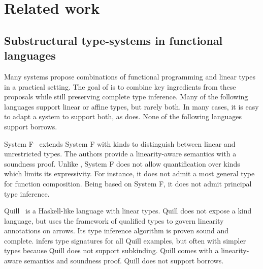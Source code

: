 \section{Related work}
\label{sec:related-work}





\subsection{Substructural type-systems in functional languages}

Many systems propose combinations of
functional programming and linear types in a practical setting.
The goal of \lang is to combine key ingredients
from these proposals while still preserving
complete type inference.
Many of the following languages support linear or affine types, but rarely
both. In many cases, it is easy to adapt a system to support both, as
\lang does.
None of the following languages support borrows.

System F\degree~\citep{DBLP:conf/tldi/MazurakZZ10}
extends System F with kinds to distinguish
between linear and unrestricted types.
The authors provide
a linearity-aware semantics with a soundness proof.
Unlike \lang, System F\degree{} does not allow
quantification over kinds which limits its expressivity. For instance, it
does not admit a most general type for function composition.
Being based on System F, it does not admit
principal type inference.

Quill~\citep{DBLP:conf/icfp/Morris16} is a Haskell-like language with linear
types.
Quill does not expose a kind language, but
uses the framework of qualified types to govern linearity annotations on arrows.
Its type inference algorithm is proven sound and complete.
\lang infers type signatures for all Quill examples, but often with
simpler types because Quill does not support subkinding.
Quill comes with a linearity-aware semantics and soundness proof.
Quill does not support borrows.


